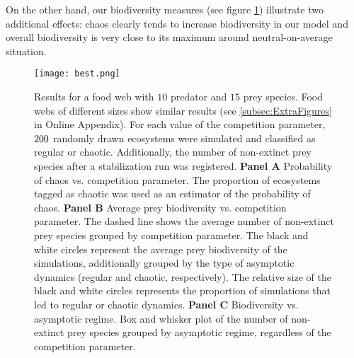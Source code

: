 On the other hand, our biodiversity measures (see figure \ref{fig:Biodiversity}) illustrate two additional effects: chaos clearly tends to increase biodiversity in our model and overall biodiversity is very close to its maximum around neutral-on-average situation.

\begin{figure}
	\begin{center}
		\texttt{[image: best.png]}
	\end{center}
	\caption{Results for a food web with $10$ predator and $15$ prey species. Food webs of different sizes show similar results (see \ref{subsec:ExtraFigures} in Online Appendix). For each value of the competition parameter, $200$ randomly drawn ecosystems were simulated and classified as regular or chaotic. Additionally, the number of non-extinct prey species after a stabilization run was registered. \textbf{Panel A} Probability of chaos vs. competition parameter. The proportion of ecosystems tagged as chaotic was used as an estimator of the probability of chaos. \textbf{Panel B} Average prey biodiversity vs. competition parameter. The dashed line shows the average number of non-extinct prey species grouped by competition parameter. The black and white circles represent the average prey biodiversity of the simulations, additionally grouped by the type of asymptotic dynamics (regular and chaotic, respectively). The relative size of the black and white circles represents the proportion of simulations that led to regular or chaotic dynamics. \textbf{Panel C} Biodiversity vs. asymptotic regime. Box and whisker plot of the number of non-extinct prey species grouped by asymptotic regime, regardless of the competition parameter.}
	\label{fig:Biodiversity}
\end{figure}